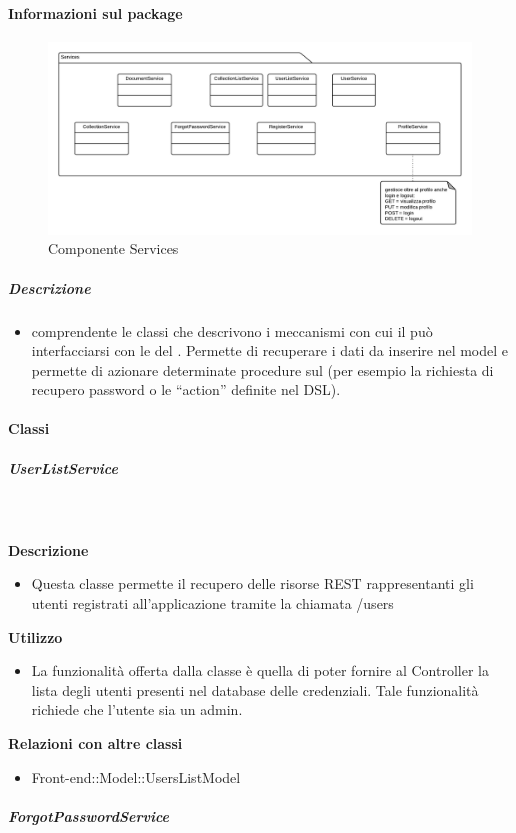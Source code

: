 	\paragraph{Informazioni sul package} 
		\begin{figure}[H] 
			\begin{center} 
				\includegraphics[width=\textwidth]{uml/package/Front-end::Services.png}  
				\caption{Componente Services}
			\end{center}  
		\end{figure} 
	\subparagraph{Descrizione} 
		\begin{itemize}
		\item[]  comprendente le classi che descrivono i meccanismi con cui il  può interfacciarsi con le  del . Permette di recuperare i dati da inserire nel model e permette di azionare determinate procedure sul  (per esempio la richiesta di recupero password o le ``action'' definite nel DSL).
		\end{itemize} 
		\paragraph{Classi}
			\subparagraph{UserListService}
				
				\textbf{\\ \\ Descrizione} 
					\begin{itemize}
						\item[] Questa classe permette il recupero delle risorse REST rappresentanti gli utenti registrati all'applicazione tramite la chiamata /users
					\end{itemize}      
				\textbf{Utilizzo}  
					\begin{itemize}
						\item[] La funzionalità offerta dalla classe è quella di poter fornire al Controller la lista degli utenti presenti nel database delle credenziali.
Tale funzionalità richiede che l'utente sia un admin.
					\end{itemize}
					\textbf{Relazioni con altre classi}
					\begin{itemize}
							\item{Front-end::Model::UsersListModel}
					\end{itemize}
			\subparagraph{ForgotPasswordService}
				
